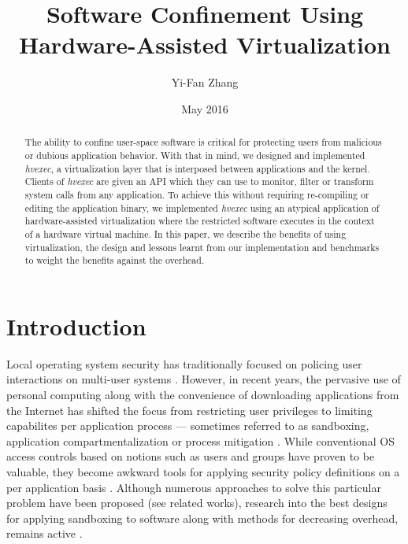 \documentclass{article}
\title{Software Confinement Using Hardware-Assisted Virtualization}
\author{Yi-Fan Zhang}
\date{May 2016}
\newcommand{\PROJNAME}{\textit{hvexec}}
\begin{document}
\maketitle

\begin{abstract}
The ability to confine user-space software is critical for protecting users from
malicious or dubious application behavior.
With that in mind, we designed and implemented \PROJNAME{}, a virtualization layer that is interposed between applications and the kernel. Clients of \PROJNAME{} are given an API which they can use to monitor, filter or transform system calls from any application. To achieve this without requiring re-compiling or editing the application binary, we implemented \PROJNAME{} using an atypical application of hardware-assisted virtualization
where the restricted software executes in the context of a hardware virtual machine.
In this paper, we describe the benefits of using virtualization, the design and lessons learnt from our implementation and benchmarks to 
weight the benefits against the overhead.
\end{abstract}

\section{Introduction}
Local operating system security has traditionally focused on policing user interactions on multi-user systems \cite{DesignImplFreeBSD}.
However, in recent years, the pervasive use of personal computing along with the convenience of downloading
applications from the Internet has shifted the focus from restricting user privileges to limiting capabilites per application process
— sometimes referred to as sandboxing, application compartmentalization or process mitigation \cite{DesignImplFreeBSD}.
While conventional OS access controls based on notions such as users and groups have proven to be valuable,
they become awkward tools for applying security policy definitions on a per application basis \cite{DesignImplFreeBSD}.
Although numerous approaches to solve this particular problem have been proposed (see related works),
research into the best designs for applying sandboxing to software along with methods for decreasing overhead, remains active \cite{Ayer2012,VCall2010,DesignImplFreeBSD}.
\end{document}
